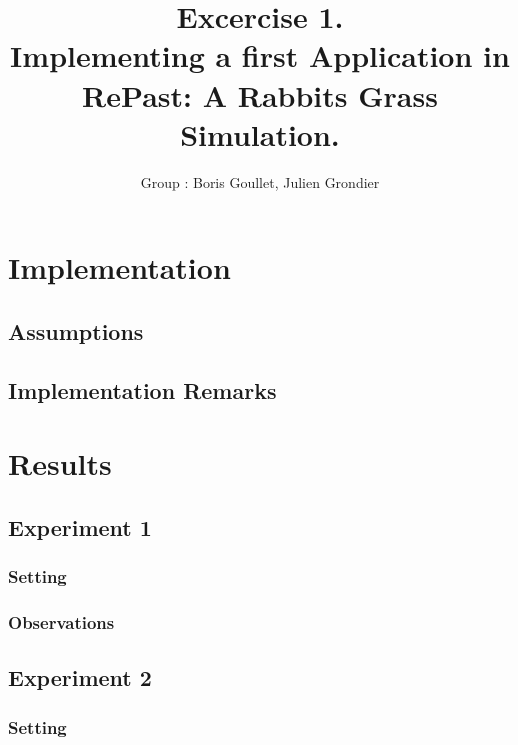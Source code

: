 \documentclass[11pt]{article}
\title{\bf Excercise 1.\\ Implementing a first Application in RePast: A Rabbits Grass Simulation.}
\author{Group \textnumero 25: Boris Goullet, Julien Grondier}
\begin{document}
\maketitle

\section{Implementation}

\subsection{Assumptions}

\subsection{Implementation Remarks}

\section{Results}

\subsection{Experiment 1}

\subsubsection{Setting}

\subsubsection{Observations}

\subsection{Experiment 2}

\subsubsection{Setting}
\end{document}
